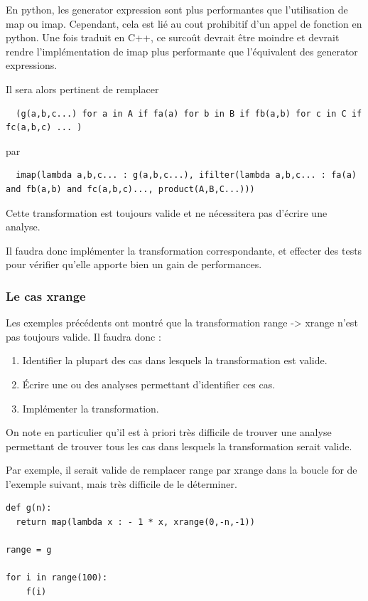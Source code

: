 \documentclass[a4paper]{article}
\begin{document}
En python, les generator expression sont plus performantes que l'utilisation de map ou imap. Cependant, cela est lié au cout prohibitif d'un appel de fonction en python. Une fois traduit en C++, ce surcoût devrait être moindre et devrait rendre l'implémentation de imap plus performante que l'équivalent des generator expressions.

Il sera alors pertinent de remplacer

\begin{verbatim}
  (g(a,b,c...) for a in A if fa(a) for b in B if fb(a,b) for c in C if fc(a,b,c) ... )
\end{verbatim}
 
par

\begin{verbatim}
  imap(lambda a,b,c... : g(a,b,c...), ifilter(lambda a,b,c... : fa(a) and fb(a,b) and fc(a,b,c)..., product(A,B,C...)))
\end{verbatim}

Cette transformation est toujours valide et ne nécessitera pas d'écrire une analyse.

Il faudra donc implémenter la transformation correspondante, et effecter des tests pour vérifier qu'elle apporte bien un gain de performances.

\subsubsection{Le cas xrange}

Les exemples précédents ont montré que la transformation range -> xrange n'est pas toujours valide. Il faudra donc :

\begin{enumerate}
  \item Identifier la plupart des cas dans lesquels la transformation est valide.
  \item Écrire une ou des analyses permettant d'identifier ces cas.
  \item Implémenter la transformation.
\end{enumerate}

On note en particulier qu'il est à priori très difficile de trouver une analyse permettant de trouver tous les cas dans lesquels la transformation serait valide.

Par exemple, il serait valide de remplacer range par xrange dans la boucle for de l'exemple suivant, mais très difficile de le déterminer.


\begin{verbatim}
def g(n):
  return map(lambda x : - 1 * x, xrange(0,-n,-1))

range = g

for i in range(100):
    f(i)
\end{verbatim}
\end{document}
